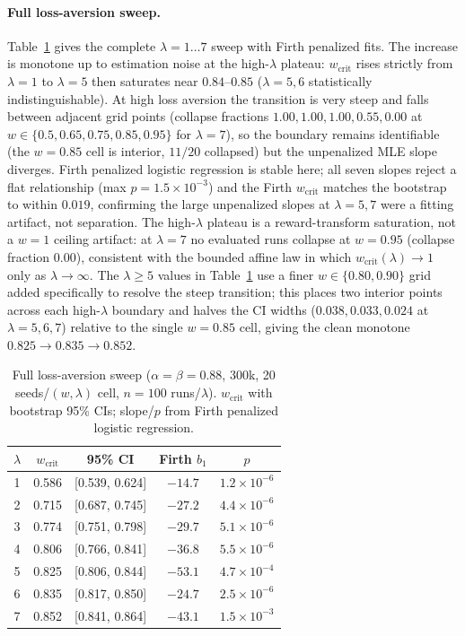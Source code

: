 \documentclass[letterpaper]{article} %
\theoremstyle{plain}
\newcommand{\wcrit}{w_{\mathrm{crit}}}
\begin{document}
\paragraph{Full loss-aversion sweep.}
Table~\ref{tab:lambda_sweep} gives the complete $\lambda{=}1{\dots}7$ sweep with Firth penalized
fits. The increase is monotone up to estimation noise at the high-$\lambda$ plateau:
$\wcrit$ rises strictly from $\lambda{=}1$ to $\lambda{=}5$ then saturates near $0.84$--$0.85$
($\lambda{=}5,6$ statistically indistinguishable). At high loss aversion the transition is
very steep and falls between adjacent grid points (collapse fractions $1.00,1.00,1.00,0.55,
0.00$ at $w\in\{0.5,0.65,0.75,0.85,0.95\}$ for $\lambda{=}7$), so the boundary remains
identifiable (the $w{=}0.85$ cell is interior, $11/20$ collapsed) but the unpenalized MLE
slope diverges. Firth penalized logistic regression is stable here; all seven slopes reject a flat
relationship (max $p=1.5\times10^{-3}$) and the Firth $\wcrit$ matches the bootstrap to within $0.019$,
confirming the large unpenalized slopes at $\lambda{=}5,7$ were a fitting artifact, not
separation. The high-$\lambda$ plateau is a reward-transform saturation, not a $w{=}1$ ceiling
artifact: at $\lambda{=}7$ no evaluated runs collapse at $w{=}0.95$ (collapse fraction $0.00$),
consistent with the bounded affine law in which $\wcrit(\lambda)\to1$ only as
$\lambda\to\infty$. The $\lambda{\geq}5$ values in Table~\ref{tab:lambda_sweep} use a finer
$w\in\{0.80,0.90\}$ grid added specifically to resolve the steep transition; this places two
interior points across each high-$\lambda$ boundary and halves the CI widths
($0.038,0.033,0.024$ at $\lambda{=}5,6,7$) relative to the single $w{=}0.85$ cell, giving the
clean monotone $0.825\to0.835\to0.852$.

\begin{table}[t]
\centering
\caption{Full loss-aversion sweep ($\alpha{=}\beta{=}0.88$, 300k, 20 seeds/$(w,\lambda)$
cell, $n{=}100$ runs/$\lambda$). $\wcrit$ with bootstrap 95\% CIs; slope/$p$ from Firth
penalized logistic regression.}
\label{tab:lambda_sweep}
\small
\begin{tabular}{ccccc}
\toprule
$\lambda$ & $\wcrit$ & 95\% CI & Firth $b_1$ & $p$ \\
\midrule
1 & 0.586 & [0.539, 0.624] & $-14.7$ & $1.2\times10^{-6}$ \\
2 & 0.715 & [0.687, 0.745] & $-27.2$ & $4.4\times10^{-6}$ \\
3 & 0.774 & [0.751, 0.798] & $-29.7$ & $5.1\times10^{-6}$ \\
4 & 0.806 & [0.766, 0.841] & $-36.8$ & $5.5\times10^{-6}$ \\
5 & 0.825 & [0.806, 0.844] & $-53.1$ & $4.7\times10^{-4}$ \\
6 & 0.835 & [0.817, 0.850] & $-24.7$ & $2.5\times10^{-6}$ \\
7 & 0.852 & [0.841, 0.864] & $-43.1$ & $1.5\times10^{-3}$ \\
\bottomrule
\end{tabular}
\end{table}
\end{document}
